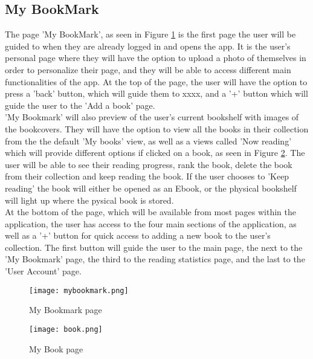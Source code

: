 \documentclass[conference]{IEEEtran}
\begin{document}
\subsection{My BookMark}
The page 'My BookMark', as seen in Figure \ref{fig:mybookmark} is the first page the user will be guided to when they are already logged in and opens the app. It is the user's personal page where they will have the option to upload a photo of themselves in order to personalize their page, and they will be able to access different main functionalities of the app. At the top of the page, the user will have the option to press a 'back' button, which will guide them to xxxx, and a '+' button which will guide the user to the 'Add a book' page. \\

'My Bookmark' will also preview of the user's current bookshelf with images of the bookcovers. They will have the option to view all the books in their collection from the the default 'My books' view, as well as a views called 'Now reading' which will provide different options if clicked on a book, as seen in Figure \ref{fig:book}. The user will be able to see their reading progress, rank the book, delete the book from their collection and keep reading the book. If the user chooses to 'Keep reading' the book will either be opened as an Ebook, or the physical bookshelf will light up where the pysical book is stored.  \\

At the bottom of the page, which will be available from most pages within the application, the user has access to the four main sections of the application, as well as a '+' button for quick access to adding a new book to the user's collection. The first button will guide the user to the main page, the next to the 'My Bookmark' page, the third to the reading statistics page, and the last to the 'User Account' page.

\begin{figure}[h]
    \centering
    \texttt{[image: mybookmark.png]}
    \caption{My Bookmark page}
    \label{fig:mybookmark}
\end{figure}

\begin{figure}[h]
    \centering
    \texttt{[image: book.png]}
    \caption{My Book page}
    \label{fig:book}
\end{figure}
\end{document}
